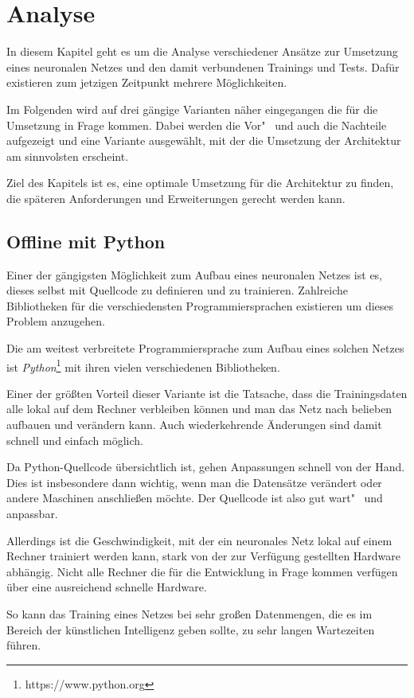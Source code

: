 \section{Analyse}
\label{sec:analyse}
In diesem Kapitel geht es um die Analyse verschiedener Ansätze zur Umsetzung eines neuronalen Netzes und den damit
verbundenen Trainings und Tests. Dafür existieren zum jetzigen Zeitpunkt mehrere Möglichkeiten.

Im Folgenden wird auf drei gängige Varianten näher eingegangen die für die Umsetzung in Frage kommen. Dabei werden die
Vor"~ und auch die Nachteile aufgezeigt und eine Variante ausgewählt, mit der die Umsetzung der Architektur am
sinnvolsten erscheint.

Ziel des Kapitels ist es, eine optimale Umsetzung für die Architektur zu finden, die späteren Anforderungen und
Erweiterungen gerecht werden kann.

\subsection{Offline mit Python}
Einer der gängigsten Möglichkeit zum Aufbau eines neuronalen Netzes ist es, dieses selbst mit Quellcode zu definieren
und zu trainieren. Zahlreiche Bibliotheken für die verschiedensten Programmiersprachen existieren um dieses Problem
anzugehen.

Die am weitest verbreitete Programmiersprache zum Aufbau eines solchen Netzes ist
\textit{Python}\footnote{https://www.python.org} mit ihren vielen verschiedenen Bibliotheken.

Einer der größten Vorteil dieser Variante ist die Tatsache, dass die Trainingsdaten alle lokal auf dem Rechner
verbleiben können und man das Netz nach belieben aufbauen und verändern kann. Auch wiederkehrende Änderungen sind damit
schnell und einfach möglich.

Da Python-Quellcode übersichtlich ist, gehen Anpassungen schnell von der Hand. Dies ist insbesondere dann wichtig, wenn
man die Datensätze verändert oder andere Maschinen anschließen möchte. Der Quellcode ist also gut wart"~ und anpassbar.

Allerdings ist die Geschwindigkeit, mit der ein neuronales Netz lokal auf einem Rechner trainiert werden kann, stark
von der zur Verfügung gestellten Hardware abhängig. Nicht alle Rechner die für die Entwicklung in Frage kommen verfügen
über eine ausreichend schnelle Hardware.

So kann das Training eines Netzes bei sehr großen Datenmengen, die es im Bereich der künstlichen Intelligenz geben
sollte, zu sehr langen Wartezeiten führen.


